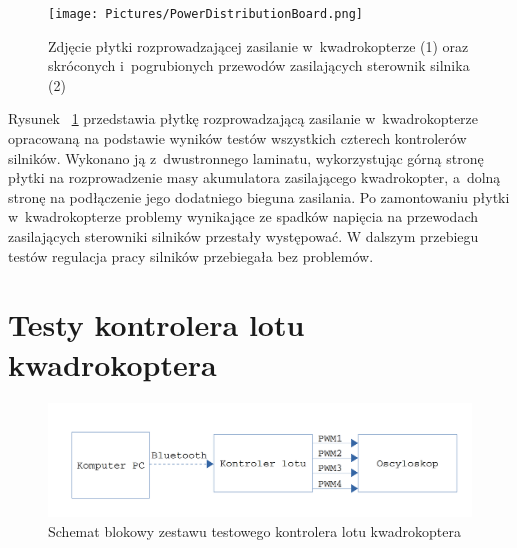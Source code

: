 \begin{figure}[H]
	\centering
	\texttt{[image: Pictures/PowerDistributionBoard.png]}
	\caption[Zdjęcie płytki rozprowadzającej zasilanie w~kwadrokopterze (1) oraz skróconych i~pogrubionych przewodów zasilających sterownik silnika (2)]{Zdjęcie płytki rozprowadzającej zasilanie w~kwadrokopterze (1) oraz skróconych i~pogrubionych przewodów zasilających sterownik silnika (2)}
	\label{fig:PowerDistribudionBoard}
\end{figure}

Rysunek ~\ref{fig:PowerDistribudionBoard} przedstawia płytkę rozprowadzającą zasilanie w~kwadrokopterze opracowaną na podstawie wyników testów wszystkich czterech kontrolerów silników. Wykonano ją z~dwustronnego laminatu, wykorzystując górną stronę płytki na rozprowadzenie masy akumulatora zasilającego kwadrokopter, a~dolną stronę na podłączenie jego dodatniego bieguna zasilania. Po zamontowaniu płytki w~kwadrokopterze problemy wynikające ze spadków napięcia na przewodach zasilających sterowniki silników przestały występować. W dalszym przebiegu testów regulacja pracy silników przebiegała bez problemów.

\section{Testy kontrolera lotu kwadrokoptera}

\begin{figure}[H]
	\centering
	\includegraphics[scale=0.2]{Pictures/QuadrotorController_test.png}
	\caption[Schemat blokowy zestawu testowego kontrolera lotu kwadrokoptera]{Schemat blokowy zestawu testowego kontrolera lotu kwadrokoptera}
	\label{fig:QuadrotorController_test}
\end{figure}

